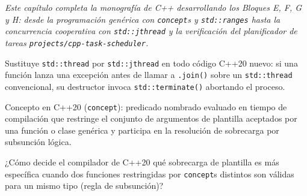 \documentclass{book}
\begin{document}
\noindent\textit{Este capítulo completa la monografía de C++ desarrollando los Bloques E, F, G y H: desde la programación genérica con \texttt{concept}s y \texttt{std::ranges} hasta la concurrencia cooperativa con \texttt{std::jthread} y la verificación del planificador de tareas \texttt{projects/cpp-task-scheduler}.}

\begin{tcolorbox}[title={Consejo}, studiumtip, breakable]

Sustituye \texttt{std::thread} por \texttt{std::jthread} en todo código C++20 nuevo: si una función lanza una excepción antes de llamar a \texttt{.join()} sobre un \texttt{std::thread} convencional, su destructor invoca \texttt{std::terminate()} abortando el proceso.
\end{tcolorbox}

\begin{tcolorbox}[title={Definición}, studiumdef, breakable]

Concepto en C++20 (\texttt{concept}): predicado nombrado evaluado en tiempo de compilación que restringe el conjunto de argumentos de plantilla aceptados por una función o clase genérica y participa en la resolución de sobrecarga por subsunción lógica.
\end{tcolorbox}

\begin{tcolorbox}[title={Autoficha}, studiumcheck, breakable]

¿Cómo decide el compilador de C++20 qué sobrecarga de plantilla es más específica cuando dos funciones restringidas por \texttt{concept}s distintos son válidas para un mismo tipo (regla de subsunción)?
\end{tcolorbox}
\end{document}
